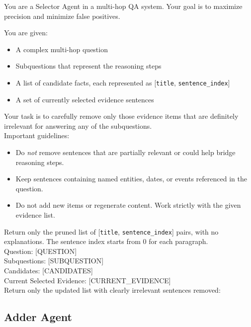 \documentclass{article} %
\begin{document}
\begin{tcolorbox}[colback=gray!5,colframe=black!40,title=Selector Agent Prompt Template, fontupper=\footnotesize]
You are a {Selector Agent} in a multi-hop QA system.  
Your goal is to {maximize precision and minimize false positives}.  

You are given:
\begin{itemize}
    \item A complex multi-hop question
    \item Subquestions that represent the reasoning steps
    \item A list of candidate facts, each represented as [\texttt{title}, \texttt{sentence\_index}]
    \item A set of {currently selected evidence} sentences
\end{itemize}

Your task is to carefully {remove only those evidence items that are definitely irrelevant} for answering any of the subquestions.  
\\
{Important guidelines:}
\begin{itemize}
    \item Do \emph{not} remove sentences that are partially relevant or could help bridge reasoning steps.
    \item Keep sentences containing named entities, dates, or events referenced in the question.
    \item Do not add new items or regenerate content. Work strictly with the given evidence list.
\end{itemize}
Return only the pruned list of [\texttt{title}, \texttt{sentence\_index}] pairs, with no explanations.  The sentence index starts from 0 for each paragraph.\\ 

Question: [QUESTION] \\ 
Subquestions: [SUBQUESTION] \\ 
Candidates: [CANDIDATES] \\ 
Current Selected Evidence: [CURRENT\_EVIDENCE] \\ 
Return only the updated list with clearly irrelevant sentences removed:
\end{tcolorbox} 

\subsection{Adder Agent}
\end{document}
